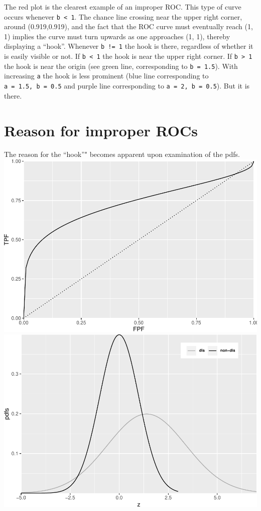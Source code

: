 \documentclass[
]{book}
\begin{document}
The red plot is the clearest example of an improper ROC. This type of curve occurs whenever \texttt{b\ \textless{}\ 1}. The chance line crossing near the upper right corner, around (0.919,0.919), and the fact that the ROC curve must eventually reach (1, 1) implies the curve must turn upwards as one approaches (1, 1), thereby displaying a ``hook''. Whenever \texttt{b\ !=\ 1} the hook is there, regardless of whether it is easily visible or not. If \texttt{b\ \textless{}\ 1} the hook is near the upper right corner. If \texttt{b\ \textgreater{}\ 1} the hook is near the origin (see green line, corresponding to \texttt{b\ =\ 1.5}). With increasing \texttt{a} the hook is less prominent (blue line corresponding to \texttt{a\ =\ 1.5,\ b\ =\ 0.5} and purple line corresponding to \texttt{a\ =\ 2,\ b\ =\ 0.5}). But it is there.

\hypertarget{reason-for-improper-rocs}{%
\section{Reason for improper ROCs}\label{reason-for-improper-rocs}}

The reason for the ``hook''" becomes apparent upon examination of the pdfs.
\includegraphics{21-improperROCs_files/figure-latex/unnamed-chunk-2-1.pdf} \includegraphics{21-improperROCs_files/figure-latex/unnamed-chunk-2-2.pdf}
\end{document}
